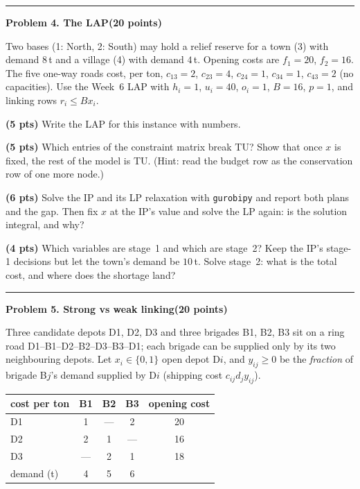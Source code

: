 \documentclass[10pt]{article}
\newcommand{\problem}[2]{%
  \par\bigskip
  {\color{ruleink}\rule{\textwidth}{1pt}}\par\nobreak\vspace{3pt}
  {\large\bfseries #2}\hfill{\normalsize\bfseries(#1 points)}\par\nobreak\vspace{4pt}}
\begin{document}
\problem{20}{Problem 4. The LAP}

Two bases (1: North, 2: South) may hold a relief reserve for a town (3) with demand
$8$\,t and a village (4) with demand $4$\,t. Opening costs are $f_1 = 20$, $f_2 = 16$.
The five one-way roads cost, per ton, $c_{13} = 2$, $c_{23} = 4$, $c_{24} = 1$,
$c_{34} = 1$, $c_{43} = 2$ (no capacities). Use the Week~6 LAP with $h_i = 1$,
$u_i = 40$, $o_i = 1$, $B = 16$, $p = 1$, and linking rows $r_i \le B x_i$.

\begin{parts}
\item \textbf{(5 pts)} Write the LAP for this instance with numbers.
\item \textbf{(5 pts)} Which entries of the constraint matrix break TU? Show that once
  $x$ is fixed, the rest of the model is TU. (Hint: read the budget row as the
  conservation row of one more node.)
\item \textbf{(6 pts)} Solve the IP and its LP relaxation with \texttt{gurobipy} and
  report both plans and the gap. Then fix $x$ at the IP's value and solve the LP again:
  is the solution integral, and why?
\item \textbf{(4 pts)} Which variables are stage~1 and which are stage~2? Keep the IP's
  stage-1 decisions but let the town's demand be $10$\,t. Solve stage~2: what is the
  total cost, and where does the shortage land?
\end{parts}

\problem{20}{Problem 5. Strong vs weak linking}

Three candidate depots D1, D2, D3 and three brigades B1, B2, B3 sit on a ring road
D1--B1--D2--B2--D3--B3--D1; each brigade can be supplied only by its two neighbouring
depots. Let $x_i \in \{0,1\}$ open depot D$i$, and $y_{ij} \ge 0$ be the \emph{fraction} of
brigade B$j$'s demand supplied by D$i$ (shipping cost $c_{ij} d_j y_{ij}$).
\begin{center}
\begin{tabular}{l|ccc|c}
 cost per ton & B1 & B2 & B3 & opening cost \\ \hline
 D1 & 1 & --- & 2 & 20 \\
 D2 & 2 & 1 & --- & 16 \\
 D3 & --- & 2 & 1 & 18 \\ \hline
 demand (t) & 4 & 5 & 6 & \\
\end{tabular}
\end{center}
\end{document}
